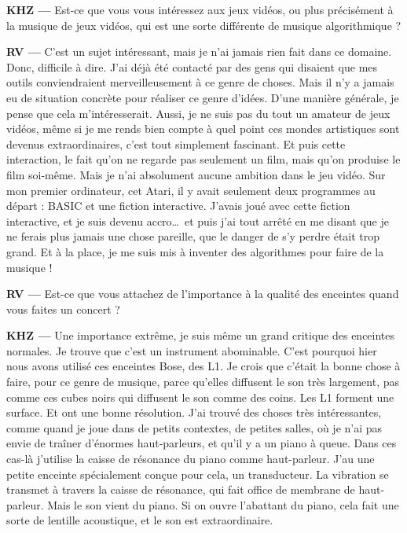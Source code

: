 \documentclass[a4paper,12pt]{article}
\begin{document}
\textbf{KHZ ---} Est-ce que vous vous intéressez aux jeux vidéos, ou plus précisément à la musique de jeux vidéos, qui est une sorte différente de musique algorithmique ?

\textbf{RV ---} C'est un sujet intéressant, mais je n'ai jamais rien fait dans ce domaine. Donc, difficile à dire. J'ai déjà été contacté par des gens qui disaient que mes outils conviendraient merveilleusement à ce genre de choses. Mais il n'y a jamais eu de situation concrète pour réaliser ce genre d'idées. D'une manière générale, je pense que cela m'intéresserait. Aussi, je ne suis pas du tout un amateur de jeux vidéos, même si je me rends bien compte à quel point ces mondes artistiques sont devenus extraordinaires, c'est tout simplement fascinant. Et puis cette interaction, le fait qu'on ne regarde pas seulement un film, mais qu'on produise le film soi-même. Mais je n'ai absolument aucune ambition dans le jeu vidéo. Sur mon premier ordinateur, cet Atari, il y avait seulement deux programmes au départ : BASIC et une fiction interactive. J'avais joué avec cette fiction interactive, et je suis devenu accro\dots~et puis j'ai tout arrêté en me disant que je ne ferais plus jamais une chose pareille, que le danger de s'y perdre était trop grand. Et à la place, je me suis mis à inventer des algorithmes pour faire de la musique !

\textbf{RV ---} Est-ce que vous attachez de l'importance à la qualité des enceintes quand vous faites un concert ?

\textbf{KHZ ---} Une importance extrême, je suis même un grand critique des enceintes normales. Je trouve que c'est un instrument abominable. C'est pourquoi hier nous avons utilisé ces enceintes Bose, des L1. Je crois que c'était la bonne chose à faire, pour ce genre de musique, parce qu'elles diffusent le son très largement, pas comme ces cubes noirs qui diffusent le son comme des coins. Les L1 forment une surface. Et ont une bonne résolution. J'ai trouvé des choses très intéressantes, comme quand je joue dans de petits contextes, de petites salles, où je n'ai pas envie de traîner d'énormes haut-parleurs, et qu'il y a un piano à queue. Dans ces cas-là j'utilise la caisse de résonance du piano comme haut-parleur. J'au une petite enceinte spécialement conçue pour cela, un transducteur. La vibration se transmet à travers la caisse de résonance, qui fait office de membrane de haut-parleur. Mais le son vient du piano. Si on ouvre l'abattant du piano, cela fait une sorte de lentille acoustique, et le son est extraordinaire.
\end{document}
